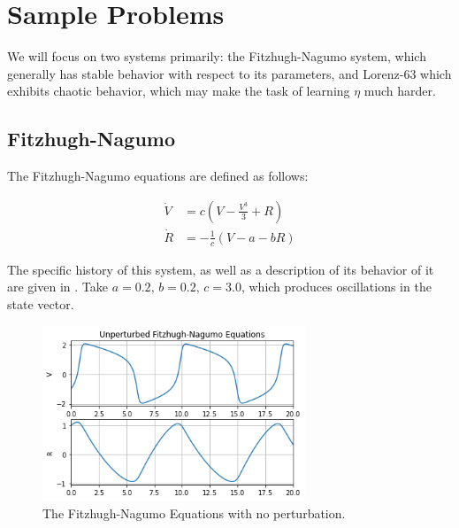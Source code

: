 \documentclass[12pt]{article}
\begin{document}








\section{Sample Problems}\label{examples}

We will focus on two systems primarily: the Fitzhugh-Nagumo system, which generally has stable behavior with respect to its parameters, and Lorenz-63 which exhibits chaotic behavior, which may make the task of learning $\eta$ much harder.


\subsection{Fitzhugh-Nagumo}

The Fitzhugh-Nagumo equations are defined as follows:

\begin{align*}
  \dot{V} &= c \left(V - \frac{V^3}{3} + R \right)\\
  \dot{R} &= -\frac{1}{c} \left( V - a - b R \right)
\end{align*}

The specific history of this system, as well as a description of its behavior of it are given in \cite{ramsay}. Take $a=0.2,\, b=0.2,\, c=3.0$, which produces oscillations in the state vector.

\begin{figure}[ht]
  \centering
  \includegraphics[width=0.7\textwidth]{fn-unperturbed.png}
  \caption{The Fitzhugh-Nagumo Equations with no perturbation.}
\end{figure}
\end{document}
